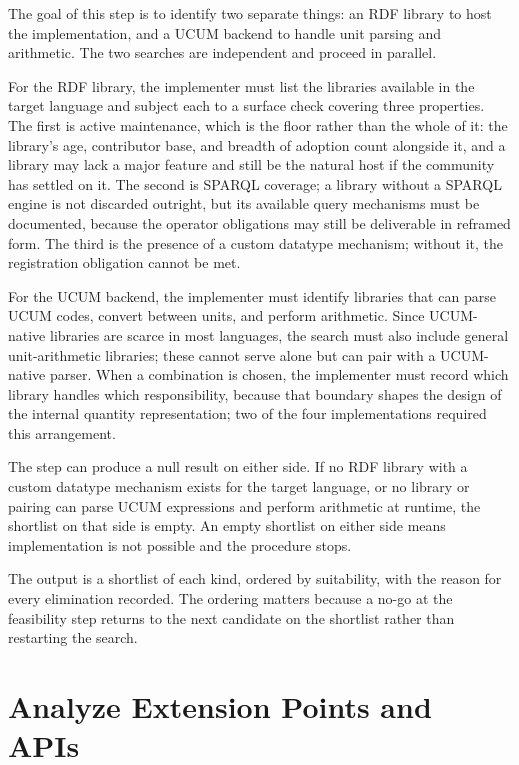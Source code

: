 The goal of this step is to identify two separate things: an RDF library to host the implementation, and a UCUM backend to handle unit parsing and arithmetic. The two searches are independent and proceed in parallel.

For the RDF library, the implementer must list the libraries available in the target language and subject each to a surface check covering three properties. The first is active maintenance, which is the floor rather than the whole of it: the library's age, contributor base, and breadth of adoption count alongside it, and a library may lack a major feature and still be the natural host if the community has settled on it. The second is SPARQL coverage; a library without a SPARQL engine is not discarded outright, but its available query mechanisms must be documented, because the operator obligations may still be deliverable in reframed form. The third is the presence of a custom datatype mechanism; without it, the registration obligation cannot be met.

For the UCUM backend, the implementer must identify libraries that can parse UCUM codes, convert between units, and perform arithmetic. Since UCUM-native libraries are scarce in most languages, the search must also include general unit-arithmetic libraries; these cannot serve alone but can pair with a UCUM-native parser. When a combination is chosen, the implementer must record which library handles which responsibility, because that boundary shapes the design of the internal quantity representation; two of the four implementations required this arrangement.

The step can produce a null result on either side. If no RDF library with a custom datatype mechanism exists for the target language, or no library or pairing can parse UCUM expressions and perform arithmetic at runtime, the shortlist on that side is empty. An empty shortlist on either side means implementation is not possible and the procedure stops.

The output is a shortlist of each kind, ordered by suitability, with the reason for every elimination recorded. The ordering matters because a no-go at the feasibility step returns to the next candidate on the shortlist rather than restarting the search.

\section{Analyze Extension Points and APIs}

